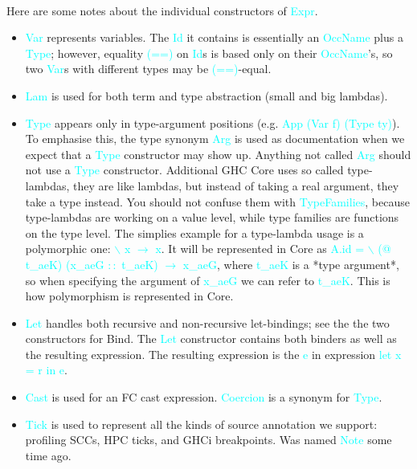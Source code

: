 \documentclass{article}
\begin{document}
	\paragraph{}
	Here are some notes about the individual constructors of \textcolor{cyan}{Expr}.
	\begin{itemize}
		\item \textcolor{cyan}{Var} represents variables. The \textcolor{cyan}{Id} it contains is essentially an \textcolor{cyan}{OccName} plus a \textcolor{cyan}{Type}; however, equality \textcolor{cyan}{(==)} on \textcolor{cyan}{Id}s is based only on their \textcolor{cyan}{OccName}'s, so two \textcolor{cyan}{Var}s with different types may be \textcolor{cyan}{(==)}-equal.
		\item \textcolor{cyan}{Lam} is used for both term and type abstraction (small and big lambdas).
		\item \textcolor{cyan}{Type} appears only in type-argument positions (e.g. \textcolor{cyan}{App (Var f) (Type ty)}). To emphasise this, the type synonym \textcolor{cyan}{Arg} is used as documentation when we expect that a \textcolor{cyan}{Type} constructor may show up. Anything not called \textcolor{cyan}{Arg} should not use a \textcolor{cyan}{Type} constructor. Additional GHC Core uses so called type-lambdas, they are like lambdas, but instead of taking a real argument, they take a type instead. You should not confuse them with \textcolor{cyan}{TypeFamilies}, because type-lambdas are working on a value level, while type families are functions on the type level. The simplies example for a type-lambda usage is a polymorphic one: \textcolor{cyan}{$\backslash$ x $\rightarrow$ x}. It will be represented in Core as \textcolor{cyan}{A.id = $\backslash$ (@ t\_aeK) (x\_aeG $::$ t\_aeK) $\rightarrow$ x\_aeG}, where \textcolor{cyan}{t\_aeK} is a *type argument*, so when specifying the argument of \textcolor{cyan}{x\_aeG} we can refer to \textcolor{cyan}{t\_aeK}. This is how polymorphism is represented in Core.
		\item \textcolor{cyan}{Let} handles both recursive and non-recursive let-bindings; see the the two constructors for Bind. The \textcolor{cyan}{Let} constructor contains both binders as well as the resulting expression. The resulting expression is the \textcolor{cyan}{e} in expression \textcolor{cyan}{let x = r in e}.
		\item \textcolor{cyan}{Cast} is used for an FC cast expression. \textcolor{cyan}{Coercion} is a synonym for \textcolor{cyan}{Type}.
		\item \textcolor{cyan}{Tick} is used to represent all the kinds of source annotation we support: profiling SCCs, HPC ticks, and GHCi breakpoints. Was named \textcolor{cyan}{Note} some time ago.
	\end{itemize}
\end{document}
